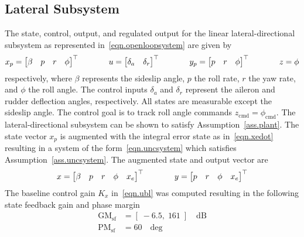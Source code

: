 \documentclass[]{../sty/aiaa-tc}
\begin{document}
  \subsection{Lateral Subsystem}

  The state, control, output, and regulated output for the linear lateral-directional subsystem as represented in\ \eqref{eqn.openloopsystem} are given by
  \begin{equation*}
    x_{p}=
    \begin{bmatrix}
      \beta & p & r & \phi
    \end{bmatrix}^{\top}
    \hspace{0.5in}
    u=
    \begin{bmatrix}
      \delta_{a} & \delta_{r}
    \end{bmatrix}^{\top}
    \hspace{0.5in}
    y_{p}=
    \begin{bmatrix}
      p & r & \phi
    \end{bmatrix}^{\top}
    \hspace{0.5in}
    z=\phi
  \end{equation*}
  respectively, where $\beta$ represents the sideslip angle, $p$ the roll rate, $r$ the yaw rate, and $\phi$ the roll angle.
  The control inputs $\delta_{a}$ and $\delta_{r}$ represent the aileron and rudder deflection angles, respectively.
  All states are measurable except the sideslip angle.
  The control goal is to track roll angle commands $z_{\text{cmd}}=\phi_{\text{cmd}}$.
  The lateral-directional subsystem can be shown to satisfy Assumption~\ref{ass.plant}.
  The state vector $x_{p}$ is augmented with the integral error state as in\ \eqref{eqn.xedot} resulting in a system of the form\ \eqref{eqn.uncsystem} which satisfies Assumption~\ref{ass.uncsystem}.
  The augmented state and output vector are
  \begin{equation*}
    x=
    \begin{bmatrix}
      \beta & p & r & \phi & x_{e}
    \end{bmatrix}^{\top}
    \hspace{0.5in}
    y=
    \begin{bmatrix}
      p & r & \phi & x_{e}
    \end{bmatrix}^{\top}
  \end{equation*}
  The baseline control gain $K_{x}$ in\ \eqref{eqn.ubl} was computed resulting in the following state feedback gain and phase margin
  \begin{align*}
    \text{GM}_{\text{sf}}&=[\;-6.5,\; 161\;] \quad \text{dB}\\
    \text{PM}_{\text{sf}}&=60 \quad \text{deg}
  \end{align*}
\end{document}

